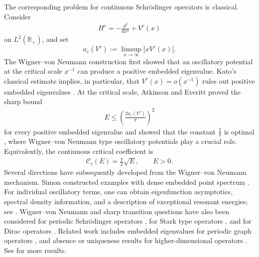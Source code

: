 \documentclass[12pt]{amsart}
\theoremstyle{plain}
\theoremstyle{definition}
\begin{document}
The corresponding problem for continuous Schr\"odinger operators is
classical. Consider
\begin{align}
	H^c=-\frac{d^2}{dx^2}+V^c(x)
	\nonumber
\end{align}
on $L^2(\mathbb R_+)$, and set
\[
a_c(V^c):=\limsup_{x\to\infty}|xV^c(x)|.
\]
The Wigner--von Neumann construction \cite{vonNeumannWigner} first showed that
an oscillatory potential at the critical scale $x^{-1}$ can produce a
positive embedded eigenvalue. Kato's classical estimate implies, in
particular, that $V^c(x)=o(x^{-1})$ rules out positive embedded
eigenvalues \cite{Kato}. At the critical scale, Atkinson and
Everitt proved the sharp bound
\begin{align}
	E\leq \left(\frac{2a_c(V^c)}{\pi}\right)^2
	\nonumber
\end{align}
for every positive embedded eigenvalue and showed that the constant $\frac{2}{\pi}$ is
optimal \cite{AtkinsonEveritt}, where Wigner--von Neumann  type oscillatory potentials play a crucial role. Equivalently,
the continuous critical coefficient is
\begin{align}
	\mathcal C_c(E)=\frac{\pi}{2}\sqrt{E},
	\qquad E>0.
	\nonumber
\end{align}
Several directions have subsequently developed from the Wigner--von Neumann mechanism.  Simon constructed
examples with dense embedded point spectrum
\cite{SimonDense}.  For individual oscillatory terms, one can
obtain eigenfunction
asymptotics, spectral density information, and a
description of exceptional resonant energies; see
\cite{Behncke,HintonKlausShaw,LukicJST,LukicCMP,SimonovZeros}. Wigner--von Neumann and sharp transition questions have also been
considered for periodic Schr\"odinger operators
\cite{NabokoSimonov,LukicOng,LyuYang},
for Stark type operators
\cite{LiuStarkJFA}, and for Dirac operators
\cite{KhapreLyuYu}.  Related work includes 
embedded eigenvalues for periodic graph operators \cite{Shipman},
and absence or uniqueness results for higher-dimensional
operators \cite{LiuFermi,LiYangNLS}. See \cite{SimonJacobiDense,JudgeNabokoWood,Kruger,RemlingDiscrete,LiuLyuResonant} for more results.
\end{document}
